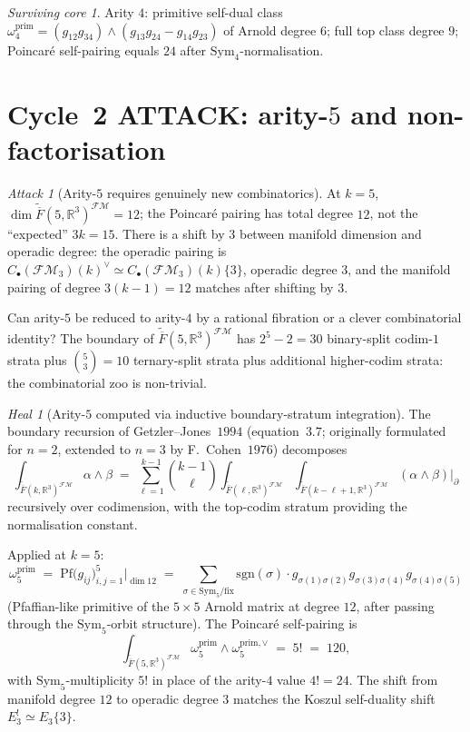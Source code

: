\documentclass[11pt]{article}
\theoremstyle{definition}
\theoremstyle{remark}
\newtheorem{attack}[theorem]{Attack}
\newtheorem{heal}[theorem]{Heal}
\newtheorem{survivor}[theorem]{Surviving core}
\providecommand{\FMbar}{\overline{F}}
\providecommand{\FM}{\mathcal{FM}}
\providecommand{\FMop}{\mathcal{FM}}
\providecommand{\FM}{\mathrm{FM}}
\providecommand{\RR}{\mathbb{R}}
\providecommand{\Sym}{\mathrm{Sym}}
\begin{document}
\begin{survivor}
Arity $4$: primitive self-dual class
$\omega_4^{\mathrm{prim}} = (g_{12} g_{34}) \wedge (g_{13} g_{24} - g_{14} g_{23})$
of Arnold degree $6$; full top class degree $9$; Poincar\'e
self-pairing equals $24$ after $\Sym_4$-normalisation.
\end{survivor}

\section{Cycle~2 ATTACK: arity-$5$ and non-factorisation}

\begin{attack}[Arity-$5$ requires genuinely new combinatorics]
\label{att:b-cycle-2}
At $k = 5$, $\dim \widetilde{\FMbar}(5,\RR^3)^{\FM} = 12$; the Poincar\'e
pairing has total degree $12$, not the ``expected'' $3k = 15$. There
is a shift by $3$ between manifold dimension and operadic degree: the
operadic pairing is
$C_\bullet(\FMop_3)(k)^{\vee} \simeq C_\bullet(\FMop_3)(k)\{3\}$,
operadic degree $3$, and the manifold pairing of degree
$3(k-1) = 12$ matches after shifting by $3$.

Can arity-$5$ be reduced to arity-$4$ by a rational fibration or
a clever combinatorial identity? The boundary of
$\widetilde{\FMbar}(5,\RR^3)^{\FM}$ has $2^5 - 2 = 30$ binary-split
codim-$1$ strata plus $\binom{5}{3} = 10$ ternary-split strata
plus additional higher-codim strata: the combinatorial zoo is
non-trivial.
\end{attack}

\begin{heal}[Arity-$5$ computed via inductive boundary-stratum
integration]
\label{heal:b-cycle-2}
The boundary recursion of Getzler--Jones~$1994$ (equation~$3.7$;
originally formulated for $n = 2$, extended to $n = 3$ by
F.~Cohen~$1976$) decomposes
\[
 \int_{\widetilde{\FMbar}(k,\RR^3)^{\FM}} \alpha \wedge \beta
 \;=\;
 \sum_{\ell=1}^{k-1} \binom{k-1}{\ell}
  \int_{\widetilde{\FMbar}(\ell,\RR^3)^{\FM}}
  \int_{\widetilde{\FMbar}(k-\ell+1,\RR^3)^{\FM}}
  (\alpha \wedge \beta)|_{\partial}
\]
recursively over codimension, with the top-codim stratum providing
the normalisation constant.

Applied at $k = 5$:
\[
 \omega_5^{\mathrm{prim}} \;=\;
 \mathrm{Pf}\big(g_{ij}\big)_{i,j=1}^{5}\big|_{\dim 12}
 \;=\;
 \sum_{\sigma \in \Sym_5 / \mathrm{fix}}
 \mathrm{sgn}(\sigma) \cdot g_{\sigma(1)\sigma(2)} g_{\sigma(3)\sigma(4)} g_{\sigma(4)\sigma(5)}
\]
(Pfaffian-like primitive of the $5 \times 5$ Arnold matrix at
degree $12$, after passing through the $\Sym_5$-orbit structure).
The Poincar\'e self-pairing is
\[
 \int_{\widetilde{\FMbar}(5,\RR^3)^{\FM}}
 \omega_5^{\mathrm{prim}} \wedge \omega_5^{\mathrm{prim},\vee}
 \;=\; 5!
 \;=\; 120,
\]
with $\Sym_5$-multiplicity $5!$ in place of the arity-$4$ value $4! = 24$.
The shift from manifold degree $12$ to operadic degree $3$ matches
the Koszul self-duality shift $E_3^! \simeq E_3\{3\}$.
\end{heal}
\end{document}
